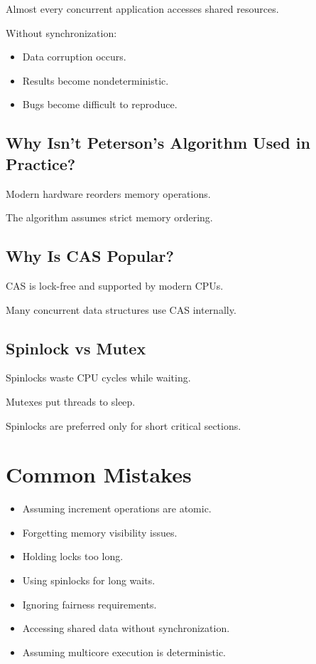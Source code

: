 Almost every concurrent application accesses shared resources.

Without synchronization:

\begin{itemize}
\item Data corruption occurs.
\item Results become nondeterministic.
\item Bugs become difficult to reproduce.
\end{itemize}

\subsection{Why Isn't Peterson's Algorithm Used in Practice?}

Modern hardware reorders memory operations.

The algorithm assumes strict memory ordering.

\subsection{Why Is CAS Popular?}

CAS is lock-free and supported by modern CPUs.

Many concurrent data structures use CAS internally.

\subsection{Spinlock vs Mutex}

Spinlocks waste CPU cycles while waiting.

Mutexes put threads to sleep.

Spinlocks are preferred only for short critical sections.

\section{Common Mistakes}

\begin{itemize}
\item Assuming increment operations are atomic.
\item Forgetting memory visibility issues.
\item Holding locks too long.
\item Using spinlocks for long waits.
\item Ignoring fairness requirements.
\item Accessing shared data without synchronization.
\item Assuming multicore execution is deterministic.
\end{itemize}

